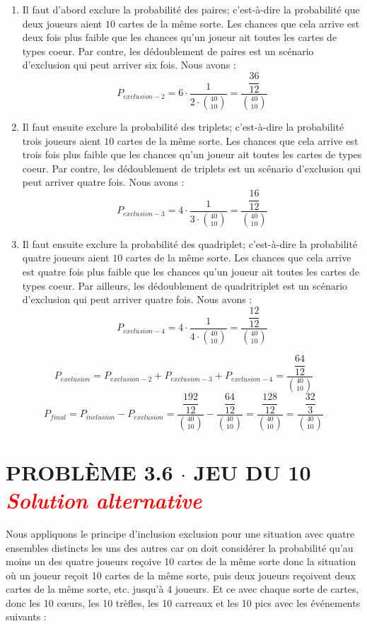 \documentclass[8pt]{report}
\begin{document}
        \begin{enumerate}
            \item Il faut d'abord exclure la probabilité des paires; c'est-à-dire la probabilité que deux joueurs 
                aient $10$ cartes de la même sorte. Les chances que cela arrive est deux fois plus faible que les chances 
                qu'un joueur ait toutes les cartes de types coeur. Par contre, les dédoublement de paires est un 
                scénario d'exclusion qui peut arriver six fois. Nous avons : 
                \[ P_{exclusion-2} = 6 \cdot \dfrac{1}{2\cdot{40 \choose 10}} = \dfrac{\dfrac{36}{12}}{{40 \choose 10}}\]

            \item Il faut ensuite exclure la probabilité des triplets; c'est-à-dire la probabilité trois joueurs 
                aient $10$ cartes de la même sorte. Les chances que cela arrive est trois fois plus faible que les chances 
                qu'un joueur ait toutes les cartes de types coeur. Par contre, les dédoublement de triplets est un 
                scénario d'exclusion qui peut arriver quatre fois. Nous avons : 
                \[ P_{exclusion-3} = 4 \cdot \dfrac{1}{3\cdot{40 \choose 10}} = \dfrac{\dfrac{16}{12}}{{40 \choose 10}}\]

            \item Il faut ensuite exclure la probabilité des quadriplet; c'est-à-dire la probabilité quatre joueurs 
                aient $10$ cartes de la même sorte. Les chances que cela arrive est quatre fois plus faible que les chances 
                qu'un joueur ait toutes les cartes de types coeur. Par ailleurs, les dédoublement de quadritriplet est un 
                scénario d'exclusion qui peut arriver quatre fois. Nous avons : 
                \[ P_{exclusion-4} = 4 \cdot \dfrac{1}{4\cdot{40 \choose 10}} = \dfrac{\dfrac{12}{12}}{{40 \choose 10}}\]

        \end{enumerate}
        \[ P_{exclusion} = P_{exclusion-2} + P_{exclusion-3} + P_{exclusion-4} = \dfrac{\dfrac{64}{12}}{{40 \choose 10}} \]
        \[ P_{final} = P_{inclusion} - P_{exclusion} = 
            \dfrac{\dfrac{192}{12}}{{40 \choose 10}} - \dfrac{\dfrac{64}{12}}{{40 \choose 10}} 
            = \dfrac{\dfrac{128}{12}}{{40 \choose 10}} = \dfrac{\dfrac{32}{3}}{{40 \choose 10}}
        \]

        \pagebreak 
        \section*{\textnormal{PROBLÈME 3.6 \;\;\;\; $\cdot$ \;\;\;\; JEU DU 10 \hspace*{\fill} \textit{\textcolor{red}{Solution alternative}  }  }}
        Nous appliquons le principe d'inclusion exclusion pour une situation avec quatre ensembles distincts les uns des autres car on doit considérer la probabilité qu'au moins un des quatre joueurs reçoive 10 cartes de la même sorte donc la situation où un joueur reçoit 10 cartes de la même sorte, puis deux joueurs reçoivent deux cartes de la même sorte, etc. jusqu'à 4 joueurs. Et ce avec chaque sorte de cartes, donc les 10 cœurs, les 10 trèfles, les 10 carreaux et les 10 pics avec les événements suivants :
\end{document}
